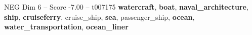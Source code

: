 \begin{textsample}{NEG Dim 6 – Score -7.00 – t007175}  \label{ex:f6_neg_024}
\textbf{watercraft}, \textbf{boat}, \textbf{naval\_architecture}, \textbf{ship}, \textbf{cruiseferry}, cruise\_ship, \textbf{sea}, passenger\_ship, \textbf{ocean}, \textbf{water\_transportation}, \textbf{ocean\_liner}

\end{textsample}
